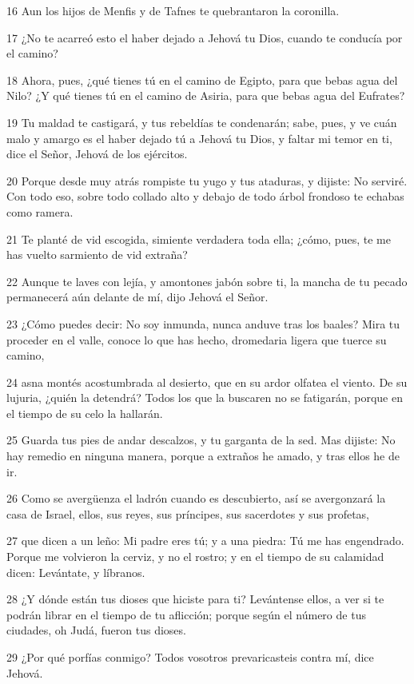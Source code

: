 \par 16 Aun los hijos de Menfis y de Tafnes te quebrantaron la coronilla.
\par 17 ¿No te acarreó esto el haber dejado a Jehová tu Dios, cuando te conducía por el camino?
\par 18 Ahora, pues, ¿qué tienes tú en el camino de Egipto, para que bebas agua del Nilo? ¿Y qué tienes tú en el camino de Asiria, para que bebas agua del Eufrates?
\par 19 Tu maldad te castigará, y tus rebeldías te condenarán; sabe, pues, y ve cuán malo y amargo es el haber dejado tú a Jehová tu Dios, y faltar mi temor en ti, dice el Señor, Jehová de los ejércitos.
\par 20 Porque desde muy atrás rompiste tu yugo y tus ataduras, y dijiste: No serviré. Con todo eso, sobre todo collado alto y debajo de todo árbol frondoso te echabas como ramera.
\par 21 Te planté de vid escogida, simiente verdadera toda ella; ¿cómo, pues, te me has vuelto sarmiento de vid extraña?
\par 22 Aunque te laves con lejía, y amontones jabón sobre ti, la mancha de tu pecado permanecerá aún delante de mí, dijo Jehová el Señor.
\par 23 ¿Cómo puedes decir: No soy inmunda, nunca anduve tras los baales? Mira tu proceder en el valle, conoce lo que has hecho, dromedaria ligera que tuerce su camino,
\par 24 asna montés acostumbrada al desierto, que en su ardor olfatea el viento. De su lujuria, ¿quién la detendrá? Todos los que la buscaren no se fatigarán, porque en el tiempo de su celo la hallarán.
\par 25 Guarda tus pies de andar descalzos, y tu garganta de la sed. Mas dijiste: No hay remedio en ninguna manera, porque a extraños he amado, y tras ellos he de ir.
\par 26 Como se avergüenza el ladrón cuando es descubierto, así se avergonzará la casa de Israel, ellos, sus reyes, sus príncipes, sus sacerdotes y sus profetas,
\par 27 que dicen a un leño: Mi padre eres tú; y a una piedra: Tú me has engendrado. Porque me volvieron la cerviz, y no el rostro; y en el tiempo de su calamidad dicen: Levántate, y líbranos.
\par 28 ¿Y dónde están tus dioses que hiciste para ti? Levántense ellos, a ver si te podrán librar en el tiempo de tu aflicción; porque según el número de tus ciudades, oh Judá, fueron tus dioses.
\par 29 ¿Por qué porfías conmigo? Todos vosotros prevaricasteis contra mí, dice Jehová.
